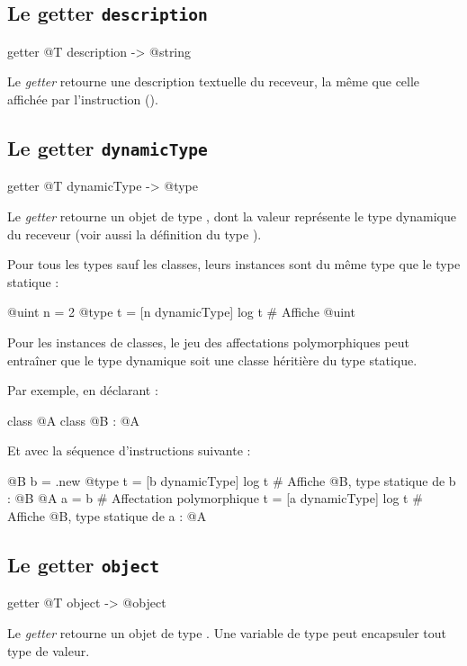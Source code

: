\subsection{Le getter \texttt{description}}

\begin{galgascode}
getter @T description -> @string
\end{galgascode}

Le \emph{getter}  retourne une description textuelle du receveur, la même que celle affichée par l'instruction  ().



\subsection{Le getter \texttt{dynamicType}}

\begin{galgascode}
getter @T dynamicType -> @type
\end{galgascode}

Le \emph{getter}  retourne un objet de type , dont la valeur représente le type dynamique du receveur (voir aussi la définition du type ).

Pour tous les types sauf les classes, leurs instances sont du même type que le type statique :

\begin{galgascode}
@uint n = 2
@type t = [n dynamicType]
log t # Affiche @uint
\end{galgascode}

Pour les instances de classes, le jeu des affectations polymorphiques peut entraîner que le type dynamique soit une classe héritière du type statique.

Par exemple, en déclarant :
\begin{galgascode}
class @A { }
class @B : @A { }
\end{galgascode}

Et avec la séquence d'instructions suivante :
\begin{galgascode}
@B b = .new
@type t = [b dynamicType]
log t # Affiche @B, type statique de b : @B
@A a = b # Affectation polymorphique
t = [a dynamicType]
log t # Affiche @B, type statique de a : @A
\end{galgascode}





\subsection{Le getter \texttt{object}}

\begin{galgascode}
getter @T object -> @object
\end{galgascode}


Le \emph{getter}  retourne un objet de type . Une variable de type  peut encapsuler tout type de valeur.


